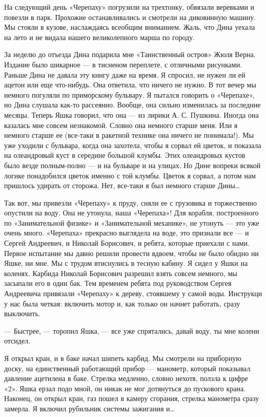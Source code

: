 На следующий день «Черепаху» погрузили на трехтонку, обвязали веревками  и
повезли в парк. Прохожие останавливались и смотрели на диковинную  машину.
Мы стояли в кузове, наслаждаясь всеобщим вниманием. Жаль, что Дина  уехала
на лето и не видала нашего великолепного марша по городу.

За неделю до отъезда Дина  подарила мне «Таинственный остров» Жюля  Верна.
Издание было  шикарное  — в  тисненом  переплете, с  отличными  рисунками.
Раньше Дина не давала эту книгу даже  на время. Я спросил, не нужен ли  ей
ацетон или еще что-нибудь. Она ответила, что ничего не нужно. В тот  вечер
мы  немного  погуляли  по  приморскому  бульвару.  Я  пытался  говорить   о
«Черепахе»,  но  Дина  слушала   как-то  рассеянно.  Вообще,  она   сильно
изменилась за последние месяцы. Теперь Яшка  говорил, что она — из  лирики
А. С.  Пушкина. Иногда  она  казалась мне  совсем незнакомой.  Словно  она
немного старше меня. Или я немного старше ее (все-таки в ракетной  технике
она ничего не понимала!). Мы уже  уходили с бульвара, когда она  захотела,
чтобы я  сорвал ей  цветок,  и показала  на  олеандровый куст  в  середине
большой клумбы. Этих  олеандровых кустов  было везде полным-полно  — и  на
бульваре и на  улицах. Но  Дине вопреки всякой  логике понадобился  цветок
именно с той  клумбы. Цветок  я сорвал, а  потом нам  пришлось удирать  от
сторожа. Нет, все-таки я был немного старше Дины…

Так  вот,  мы  привезли  «Черепаху»  к  пруду,  сняли  ее  с  грузовика  и
торжественно опустили  на  воду.  Она не  утонула,  наша  «Черепаха»!  Для
корабля,  построенного   по   «Занимательной  физике»   и   «Занимательной
механике»,  не  утонуть  —  это  уже  очень  много.  «Черепаха»  прекрасно
выглядела на  воде, это  признали  все —  и  Сергей Андреевич,  и  Николай
Борисович, и ребята, которые  приехали с нами.  Первое испытание мы  давно
решили провести вдвоем, чтобы не было обидно ни Яшке, ни мне. Мы с  трудом
втиснулись в тесную  кабину. Я сидел  у Яшки на  коленях. Карбида  Николай
Борисович разрешил взять совсем немного, мы  засыпали его в один бак.  Тем
временем ребята под руководством Сергея Андреевича привязали «Черепаху»  к
дереву, стоявшему  у самой  воды. Инструкци  у нас  была четкая:  включить
мотор и, как только он начнет работать, сразу выключить.

— Быстрее, — торопил Яшка, — все уже спрятались, давай воду, ты мне колени
отсидел.

Я открыл кран,  и в  баке начал шипеть  карбид. Мы  смотрели на  приборную
доску, на  единственный работающий  прибор —  манометр, который  показывал
давление ацетилена в баке. Стрелка медленно, словно нехотя, ползла к цифре
«2». Яшка ерзал подо мной, он  никак не мог дотянуться до пускового  крана.
Наконец, он открыл кран,  газ пошел в  камеру сгорания, стрелка  манометра
сразу замерла. Я включил рубильник системы зажигания и…

